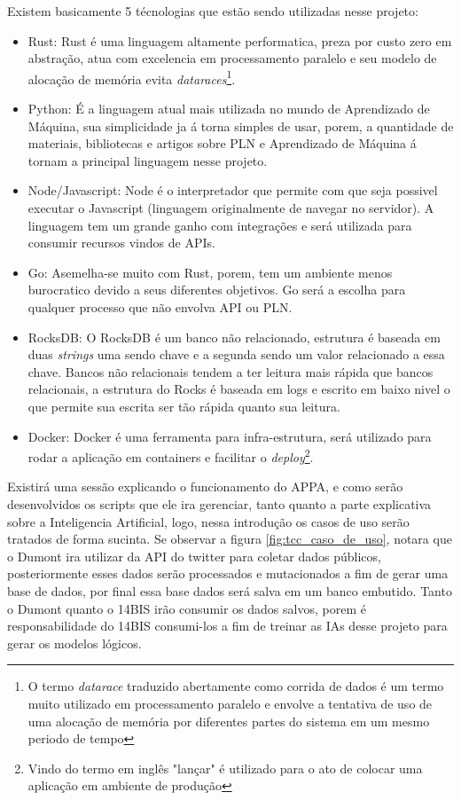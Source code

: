 Existem basicamente 5 técnologias que estão sendo utilizadas nesse projeto:
\begin{itemize}
 \item Rust: Rust é uma linguagem altamente performatica, preza por custo zero em abstração, atua com excelencia em processamento paralelo e seu modelo de alocação de memória evita \textit{dataraces}\footnote{O termo \textit{datarace} traduzido abertamente como corrida de dados é um termo muito utilizado em processamento paralelo e envolve a tentativa de uso de uma alocação de memória por diferentes partes do sistema em um mesmo periodo de tempo}.
 \item Python: É a linguagem atual mais utilizada no mundo de Aprendizado de Máquina, sua simplicidade ja á torna simples de usar, porem, a quantidade de materiais, bibliotecas e artigos sobre PLN e Aprendizado de Máquina á tornam a principal linguagem nesse projeto.
 \item Node/Javascript: Node é o interpretador que permite com que seja possivel executar o Javascript (linguagem originalmente de navegar no servidor). A linguagem tem um grande ganho com integrações e será utilizada para consumir recursos vindos de APIs.
 \item Go: Asemelha-se muito com Rust, porem, tem um ambiente menos burocratico devido a seus diferentes objetivos. Go será a escolha para qualquer processo que não envolva API ou PLN.
 \item RocksDB: O RocksDB é um banco não relacionado, estrutura é baseada em duas \textit{strings} uma sendo chave e a segunda sendo um valor relacionado a essa chave. Bancos não relacionais tendem a ter leitura mais rápida que bancos relacionais, a estrutura do Rocks é baseada em logs e escrito em baixo nivel o que permite sua escrita ser tão rápida quanto sua leitura.
 \item Docker: Docker é uma ferramenta para infra-estrutura, será utilizado para rodar a aplicação em containers e facilitar o \textit{deploy}\footnote{Vindo do termo em inglês "lançar" é utilizado para o ato de colocar uma aplicação em ambiente de produção}.
\end{itemize}

Existirá uma sessão explicando o funcionamento do APPA, e como serão desenvolvidos os scripts que ele ira gerenciar, tanto quanto a parte explicativa sobre a Inteligencia Artificial, logo, nessa introdução os casos de uso serão tratados de forma sucinta. Se observar a figura \ref{fig:tcc_caso_de_uso}, notara que o Dumont ira utilizar da API do twitter para coletar dados públicos, posteriormente esses dados serão processados e mutacionados a fim de gerar uma base de dados, por final essa base dados será salva em um banco embutido. Tanto o Dumont quanto o 14BIS irão consumir os dados salvos, porem é responsabilidade do 14BIS consumi-los a fim de treinar as IAs desse projeto para gerar os modelos lógicos.

